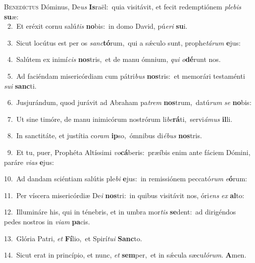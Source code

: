 \lettrine{\initial\textcolor{\initialcolor}{B}}{enedíctus} Dóminus, De\textit{us} \textbf{Is}\-raël:~\star quia visitávit, et fecit redemptiónem \textit{ple}\-\textit{bis} \textbf{su}\-æ:\\
{\numbfont\textcolor{\numbcolor}{~2.}}~Et eréxit cornu salú\textit{tis} \textbf{no}\-bis:~\star in domo David, pú\-\textit{e}\-\textit{ri} \textbf{su}\-i.\par
{\numbfont\textcolor{\numbcolor}{~3.}}~Sicut locútus est per os \textit{sanc}\-\textbf{tó}rum,~\star qui a sǽculo sunt, prophe\-\textit{tá}\-\textit{rum} \textbf{e}\-jus:\par
{\numbfont\textcolor{\numbcolor}{~4.}}~Salútem ex inimí\textit{cis} \textbf{nos}\-tris,~\star et de manu ómnium, \textit{qui} \textit{o}\-\textbf{dé}runt nos.\par
{\numbfont\textcolor{\numbcolor}{~5.}}~Ad faciéndam misericórdiam cum pátri\textit{bus} \textbf{nos}\-tris:~\star et memorári testaménti \textit{su}\-\textit{i} \textbf{sanc}\-ti.\par
{\numbfont\textcolor{\numbcolor}{~6.}}~Jusjurándum, quod jurávit ad Abraham pa\textit{trem} \textbf{nos}\-trum,~\star datú\textit{rum} \textit{se} \textbf{no}\-bis:\par
{\numbfont\textcolor{\numbcolor}{~7.}}~Ut sine timóre, de manu inimicórum nostrórum li\-\textit{be}\-\textbf{rá}ti,~\star servi\-\textit{á}\-\textit{mus} \textbf{il}\-li.\par
{\numbfont\textcolor{\numbcolor}{~8.}}~In sanctitáte, et justítia co\textit{ram} \textbf{ip}\-so,~\star ómnibus di\-\textit{é}\-\textit{bus} \textbf{nos}\-tris.\par
{\numbfont\textcolor{\numbcolor}{~9.}}~Et tu, puer, Prophéta Altíssimi \textit{vo}\-\textbf{cá}beris:~\star præíbis enim ante fáciem Dómini, paráre \textit{vi}\-\textit{as} \textbf{e}\-jus:\par
{\numbfont\textcolor{\numbcolor}{10.}}~Ad dandam sciéntiam salútis ple\textit{bi} \textbf{e}\-jus:~\star in remissiónem peccató\textit{rum} \textit{e}\-\textbf{ó}rum:\par
{\numbfont\textcolor{\numbcolor}{11.}}~Per víscera misericórdiæ De\textit{i} \textbf{nos}\-tri:~\star in quibus visitávit nos, óri\textit{ens} \textit{ex} \textbf{al}\-to:\par
{\numbfont\textcolor{\numbcolor}{12.}}~Illumináre his, qui in ténebris, et in umbra mor\textit{tis} \textbf{se}\-dent:~\star ad dirigéndos pedes nostros in \textit{vi}\-\textit{am} \textbf{pa}\-cis.\par
{\numbfont\textcolor{\numbcolor}{13.}}~Glória Patri, \textit{et} \textbf{Fí}\-lio,~\star et Spirí\-\textit{tu}\-\textit{i} \textbf{Sanc}\-to.\par
{\numbfont\textcolor{\numbcolor}{14.}}~Sicut erat in princípio, et nunc, \textit{et} \textbf{sem}\-per,~\star et in sǽcula sæcu\-\textit{ló}\-\textit{rum}. \textbf{A}\-men.\par
